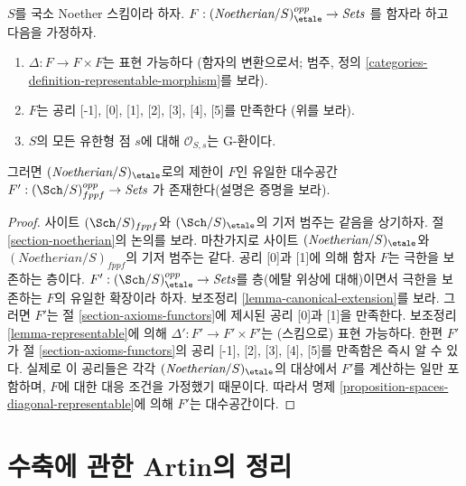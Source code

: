 \begin{proposition}
\label{proposition-spaces-diagonal-representable-noetherian}
$S$를 국소 Noether 스킴이라 하자.
$F : (\textit{Noetherian}/S)_\etale^{opp} \to \textit{Sets}$
를 함자라 하고 다음을 가정하자.
\begin{enumerate}
\item $\Delta : F \to F \times F$는 표현 가능하다
(함자의 변환으로서; 범주, 정의
\ref{categories-definition-representable-morphism}를 보라).
\item $F$는 공리 [-1], [0], [1], [2], [3], [4], [5]를 만족한다
(위를 보라).
\item $S$의 모든 유한형 점 $s$에 대해 $\mathcal{O}_{S, s}$는 G-환이다.
\end{enumerate}
그러면 $(\textit{Noetherian}/S)_\etale$로의 제한이 $F$인 유일한 대수공간
$F' : (\Sch/S)_{fppf}^{opp} \to \textit{Sets}$
가 존재한다(설명은 증명을 보라).
\end{proposition}

\begin{proof}
사이트 $(\Sch/S)_{fppf}$와 $(\Sch/S)_\etale$의 기저 범주는 같음을
상기하자. 절 \ref{section-noetherian}의 논의를 보라.
마찬가지로 사이트 $(\textit{Noetherian}/S)_\etale$와
$(\textit{Noetherian}/S)_{fppf}$의 기저 범주는 같다.
공리 [0]과 [1]에 의해 함자 $F$는 극한을 보존하는 층이다.
$F' : (\Sch/S)_\etale^{opp} \to \textit{Sets}$를
층(에탈 위상에 대해)이면서 극한을 보존하는 $F$의 유일한 확장이라 하자.
보조정리 \ref{lemma-canonical-extension}를 보라.
그러면 $F'$는 절 \ref{section-axioms-functors}에 제시된 공리 [0]과 [1]을
만족한다. 보조정리 \ref{lemma-representable}에 의해
$\Delta' : F' \to F' \times F'$는 (스킴으로) 표현 가능하다.
한편 $F'$가 절 \ref{section-axioms-functors}의 공리
[-1], [2], [3], [4], [5]를 만족함은 즉시 알 수 있다.
실제로 이 공리들은 각각 $(\textit{Noetherian}/S)_\etale$의 대상에서
$F'$를 계산하는 일만 포함하며, $F$에 대한 대응 조건을 가정했기 때문이다.
따라서 명제 \ref{proposition-spaces-diagonal-representable}에 의해
$F'$는 대수공간이다.
\end{proof}












\section{수축에 관한 Artin의 정리}
\label{section-contractions}

